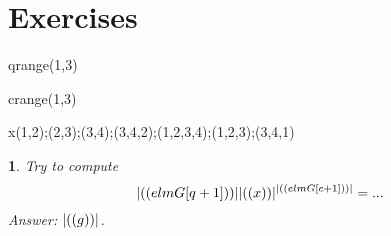 \documentclass[a4paper,twoside,leqno]{article}
\newcounter{exer}
\numberwithin{exer}{subsection}
\theoremstyle{exer}
\newtheorem{exe}[exer]{}
\begin{document}
\section{Exercises}

\begin{symfor}{q}{range(1,3)}%
\begin{symfor}{c}{range(1,3)}%
\begin{symfor}{x}{(1,2);(2,3);(3,4);(3,4,2);(1,2,3,4);(1,2,3);(3,4,1)}%

\begin{exe}
Try to compute 
\[
\sym{elmG[q+1]} \sym{x}^{\sym{elmG[c+1]} } = ...
\]
Answer: $\sym{g}$. 
\end{exe}
\end{symfor}

\end{symfor}
\end{symfor}
\end{document}
